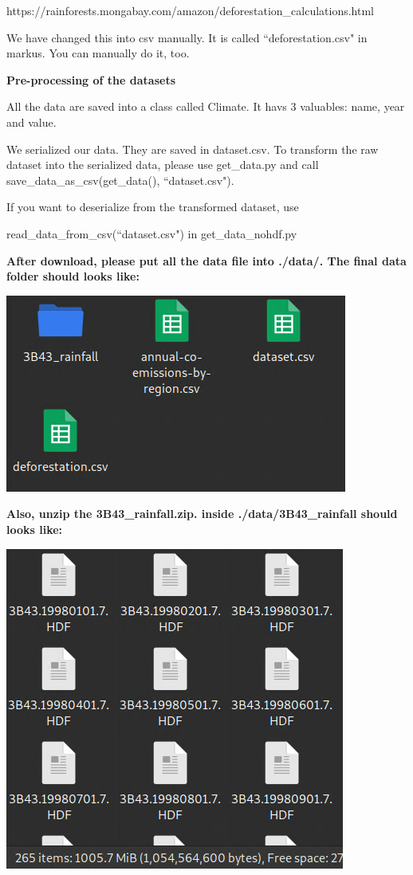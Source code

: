 \documentclass[12pt]{article}
\begin{document}
\begin{enumerate}
\begin{text}
https://rainforests.mongabay.com/amazon/deforestation\_calculations.html

We have changed this into csv manually. It is called ``deforestation.csv" in markus.
You can manually do it, too.

\textbf{Pre-processing of the datasets}

All the data are saved into a class called Climate. It havs 3 valuables: name, year and value.

We serialized our data. They are saved in dataset.csv. To transform the raw dataset into the serialized data, please use get\_data.py and call save\_data\_as\_csv(get\_data(), ``dataset.csv").

If you want to deserialize from the transformed dataset, use

read\_data\_from\_csv(``dataset.csv") in get\_data\_nohdf.py

\textbf{After download, please put all the data file into ./data/. The final data folder should looks like:
}

\includegraphics[scale=0.5]{./datafolder.png}

\textbf{Also, unzip the 3B43\_rainfall.zip. inside ./data/3B43\_rainfall should looks like:}

\includegraphics[scale=0.5]{./rainfallfolder.png}


\end{text}
\end{enumerate}
\end{document}
